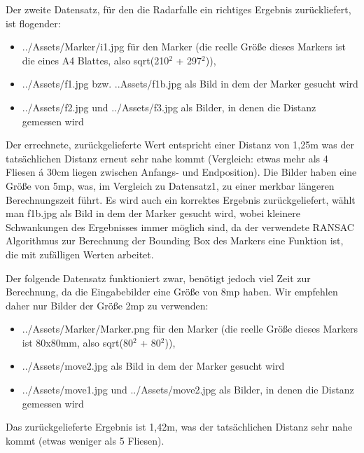 \documentclass[deutsch]{scrartcl}
\begin{document}
Der zweite Datensatz, für den die Radarfalle ein richtiges Ergebnis zurückliefert, ist flogender:
\begin{itemize}
	\item ../Assets/Marker/i1.jpg für den Marker (die reelle Größe dieses Markers ist die eines A4 Blattes, also sqrt(210$^2$ + 297$^2$)), 
	\item ../Assets/f1.jpg bzw. ..Assets/f1b.jpg als Bild in dem der Marker gesucht wird
	\item ../Assets/f2.jpg und ../Assets/f3.jpg als Bilder, in denen die Distanz gemessen wird
\end{itemize}
Der errechnete, zurückgelieferte Wert entspricht einer Distanz von 1,25m was der tatsächlichen Distanz erneut sehr nahe kommt (Vergleich: etwas mehr als 4 Fliesen á 30cm liegen zwischen Anfangs- und Endposition). Die Bilder haben eine Größe von 5mp, was, im Vergleich zu Datensatz1, zu einer merkbar längeren Berechnungszeit führt. Es wird auch ein korrektes Ergebnis zurückgeliefert, wählt man f1b.jpg als Bild in dem der Marker gesucht wird, wobei kleinere Schwankungen des Ergebnisses immer möglich sind, da der verwendete RANSAC Algorithmus zur Berechnung der Bounding Box des Markers eine Funktion ist, die mit zufälligen Werten arbeitet.

Der folgende Datensatz funktioniert zwar, benötigt jedoch viel Zeit zur Berechnung, da die Eingabebilder eine Größe von 8mp haben. Wir empfehlen daher nur Bilder der Größe 2mp zu verwenden:
\begin{itemize}
	\item ../Assets/Marker/Marker.png für den Marker (die reelle Größe dieses Markers ist 80x80mm, also sqrt(80$^2$ + 80$^2$)), 
	\item ../Assets/move2.jpg als Bild in dem der Marker gesucht wird
	\item ../Assets/move1.jpg und ../Assets/move2.jpg als Bilder, in denen die Distanz gemessen wird
\end{itemize}
Das zurückgelieferte Ergebnis ist 1,42m, was der tatsächlichen Distanz sehr nahe kommt (etwas weniger als 5 Fliesen).
\end{document}
